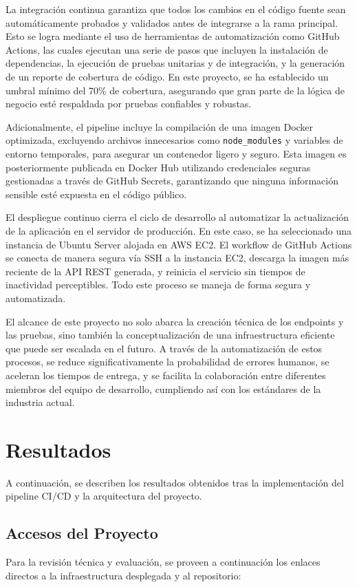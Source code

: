 \documentclass[12pt, letterpaper]{extarticle}
\begin{document}
La integración continua garantiza que todos los cambios en el código fuente sean automáticamente probados y validados antes de integrarse a la rama principal. Esto se logra mediante el uso de herramientas de automatización como GitHub Actions, las cuales ejecutan una serie de pasos que incluyen la instalación de dependencias, la ejecución de pruebas unitarias y de integración, y la generación de un reporte de cobertura de código. En este proyecto, se ha establecido un umbral mínimo del 70\% de cobertura, asegurando que gran parte de la lógica de negocio esté respaldada por pruebas confiables y robustas.

Adicionalmente, el pipeline incluye la compilación de una imagen Docker optimizada, excluyendo archivos innecesarios como \texttt{node\_modules} y variables de entorno temporales, para asegurar un contenedor ligero y seguro. Esta imagen es posteriormente publicada en Docker Hub utilizando credenciales seguras gestionadas a través de GitHub Secrets, garantizando que ninguna información sensible esté expuesta en el código público.

El despliegue continuo cierra el ciclo de desarrollo al automatizar la actualización de la aplicación en el servidor de producción. En este caso, se ha seleccionado una instancia de Ubuntu Server alojada en AWS EC2. El workflow de GitHub Actions se conecta de manera segura vía SSH a la instancia EC2, descarga la imagen más reciente de la API REST generada, y reinicia el servicio sin tiempos de inactividad perceptibles. Todo este proceso se maneja de forma segura y automatizada.

El alcance de este proyecto no solo abarca la creación técnica de los endpoints y las pruebas, sino también la conceptualización de una infraestructura eficiente que puede ser escalada en el futuro. A través de la automatización de estos procesos, se reduce significativamente la probabilidad de errores humanos, se aceleran los tiempos de entrega, y se facilita la colaboración entre diferentes miembros del equipo de desarrollo, cumpliendo así con los estándares de la industria actual.

\section{Resultados}

A continuación, se describen los resultados obtenidos tras la implementación del pipeline CI/CD y la arquitectura del proyecto. 

\subsection{Accesos del Proyecto}
Para la revisión técnica y evaluación, se proveen a continuación los enlaces directos a la infraestructura desplegada y al repositorio:
\end{document}
